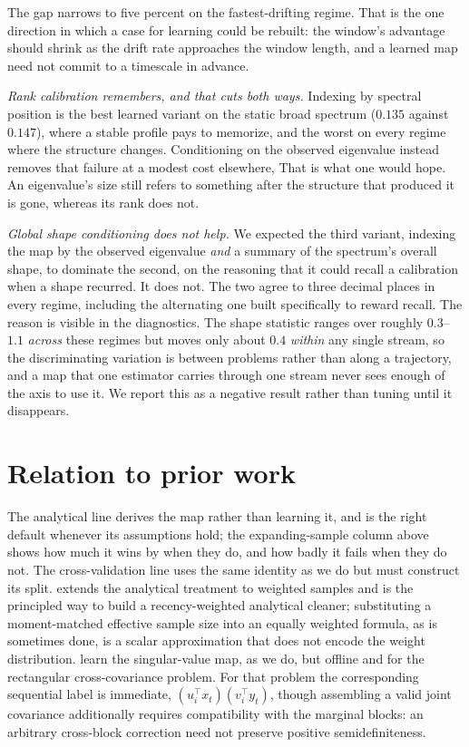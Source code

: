 \documentclass[11pt]{article}
\begin{document}
The gap narrows to five percent on the fastest-drifting regime. That is the one direction in which a
case for learning could be rebuilt: the window's advantage should shrink as the drift rate approaches
the window length, and a learned map need not commit to a timescale in advance.

\emph{Rank calibration remembers, and that cuts both ways.} Indexing by spectral position is the
best learned variant on the static broad spectrum ($0.135$ against $0.147$), where a stable profile
pays to memorize, and the worst on every regime where the structure changes. Conditioning on the
observed eigenvalue instead removes that failure at a modest cost elsewhere, That is what one would
hope. An eigenvalue's size still refers to something after the structure that produced it is gone,
whereas its rank does not.

\emph{Global shape conditioning does not help.} We expected the third variant, indexing the map by
the observed eigenvalue \emph{and} a summary of the spectrum's overall shape, to dominate the
second, on the reasoning that it could recall a calibration when a shape recurred. It does not. The
two agree to three decimal places in every regime, including the alternating one built specifically
to reward recall. The reason is visible in the diagnostics. The shape statistic ranges over roughly
$0.3$--$1.1$ \emph{across} these regimes but moves only about $0.4$ \emph{within} any single stream,
so the discriminating variation is between problems rather than along a trajectory, and a map that
one estimator carries through one stream never sees enough of the axis to use it. We report this as
a negative result rather than tuning until it disappears.

\section{Relation to prior work}

The analytical line \citep{ledoitpeche2011,ledoitwolf2020analytical,bun2017cleaning} derives the map
rather than learning it, and is the right default whenever its assumptions hold; the expanding-sample
column above shows how much it wins by when they do, and how badly it fails when they do not. The
cross-validation line \citep{bartz2016,lamrani2025holdout} uses the same identity as we do but must
construct its split. \citet{oriol2024weighted} extends the analytical treatment to weighted samples
and is the principled way to build a recency-weighted analytical cleaner; substituting a
moment-matched effective sample size into an equally weighted formula, as is sometimes done, is a
scalar approximation that does not encode the weight distribution. \citet{manolakis2026} learn the
singular-value map, as we do, but offline and for the rectangular cross-covariance problem. For that
problem the corresponding sequential label is immediate,
$(u_i^\top x_t)(v_i^\top y_t)$, though assembling a valid joint covariance additionally requires
compatibility with the marginal blocks: an arbitrary cross-block correction need not preserve
positive semidefiniteness.
\end{document}
